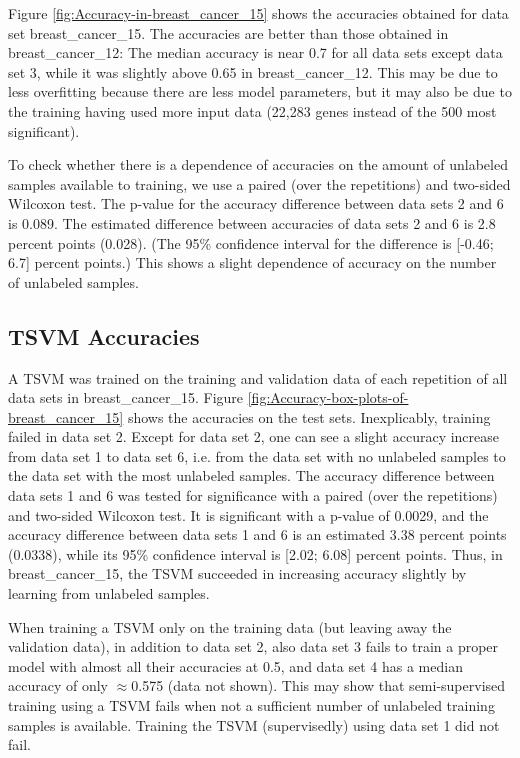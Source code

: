Figure \ref{fig:Accuracy-in-breast_cancer_15} shows the accuracies
obtained for data set breast\_cancer\_15. The accuracies are better
than those obtained in breast\_cancer\_12: The median accuracy is
near 0.7 for all data sets except data set 3, while it was slightly
above 0.65 in breast\_cancer\_12. This may be due to less overfitting
because there are less model parameters, but it may also be due to
the training having used more input data (22,283 genes instead of
the 500 most significant).

To check whether there is a dependence of accuracies on the amount
of unlabeled samples available to training, we use a paired (over
the repetitions) and two-sided Wilcoxon test. The p-value for the
accuracy difference between data sets 2 and 6 is 0.089. The estimated
difference between accuracies of data sets 2 and 6 is 2.8 percent
points (0.028). (The 95\% confidence interval for the difference is
{[}-0.46; 6.7{]} percent points.) This shows a slight dependence of
accuracy on the number of unlabeled samples.

\subsection{TSVM Accuracies}

A TSVM was trained on the training and validation data of each repetition
of all data sets in breast\_cancer\_15. Figure \ref{fig:Accuracy-box-plots-of-breast_cancer_15}
shows the accuracies on the test sets. Inexplicably, training failed
in data set 2. Except for data set 2, one can see a slight accuracy
increase from data set 1 to data set 6, i.e. from the data set with
no unlabeled samples to the data set with the most unlabeled samples.
The accuracy difference between data sets 1 and 6 was tested for significance
with a paired (over the repetitions) and two-sided Wilcoxon test.
It is significant with a p-value of 0.0029, and the accuracy difference
between data sets 1 and 6 is an estimated 3.38 percent points (0.0338),
while its 95\% confidence interval is {[}2.02; 6.08{]} percent points.
Thus, in breast\_cancer\_15, the TSVM succeeded in increasing accuracy
slightly by learning from unlabeled samples.

When training a TSVM only on the training data (but leaving away the
validation data), in addition to data set 2, also data set 3 fails
to train a proper model with almost all their accuracies at 0.5, and
data set 4 has a median accuracy of only $\approx$0.575 (data not
shown). This may show that semi-supervised training using a TSVM fails
when not a sufficient number of unlabeled training samples is available.
Training the TSVM (supervisedly) using data set 1 did not fail.

